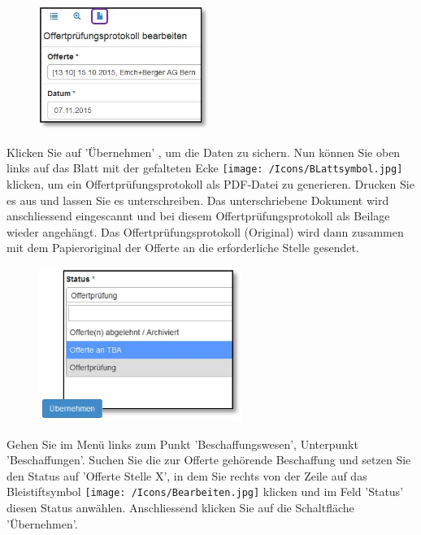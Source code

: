 \begin{figure}
\vspace{-15pt}
\includegraphics[height=40mm]{../chapters/08_Beschaffungswesen/pictures/7-1-6_OffertpruefungsprotokollPDFgen.jpg}
\end{figure}
Klicken Sie auf 'Übernehmen' , um die Daten zu sichern. Nun können Sie oben links auf das
Blatt mit der gefalteten Ecke \texttt{[image: /Icons/BLattsymbol.jpg]} klicken, um ein Offertprüfungsprotokoll als PDF-Datei zu generieren. Drucken Sie es aus und lassen Sie es unterschreiben. Das unterschriebene Dokument wird anschliessend eingescannt und bei diesem Offertprüfungsprotokoll als
Beilage wieder angehängt. Das Offertprüfungsprotokoll (Original) wird dann zusammen mit dem Papieroriginal der Offerte an die erforderliche Stelle gesendet.

\vspace{\baselineskip}

\begin{figure}
\vspace{-15pt}
\includegraphics[height=50mm]{../chapters/08_Beschaffungswesen/pictures/7-1-6_BeschaffungStatus.jpg}
\end{figure}
Gehen Sie im Menü links zum Punkt 'Beschaffungswesen', Unterpunkt 'Beschaffungen'. Suchen Sie die zur Offerte gehörende
Beschaffung und setzen Sie den Status auf 'Offerte Stelle X', in dem Sie rechts von der Zeile auf das Bleistiftsymbol \texttt{[image: /Icons/Bearbeiten.jpg]} klicken und im Feld 'Status' diesen Status anwählen. Anschliessend klicken Sie auf die Schaltfläche 'Übernehmen'.

